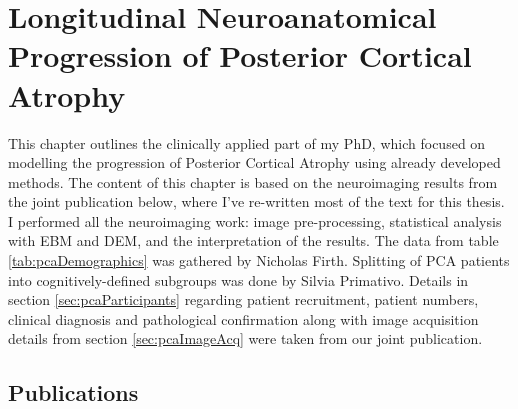 \chapter[Longitudinal Neuroanatomical Progression of PCA]{Longitudinal Neuroanatomical Progression of Posterior Cortical Atrophy}
\label{chapter:pca}

This chapter outlines the clinically applied part of my PhD, which focused on modelling the progression of Posterior Cortical Atrophy using already developed methods. The content of this chapter is based on the neuroimaging results from the joint publication below, where I've re-written most of the text for this thesis. I performed all the neuroimaging work: image pre-processing, statistical analysis with EBM and DEM, and the interpretation of the results. The data from table \ref{tab:pcaDemographics} was gathered by Nicholas Firth. Splitting of PCA patients into cognitively-defined subgroups was done by Silvia Primativo. Details in section \ref{sec:pcaParticipants} regarding patient recruitment, patient numbers, clinical diagnosis and pathological confirmation along with image acquisition details from section \ref{sec:pcaImageAcq} were taken from our joint publication.


\section{Publications}

